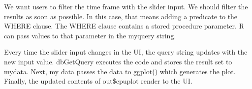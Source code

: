 \documentclass[]{article}
\newenvironment{Shaded}{\begin{snugshade}}{\end{snugshade}}
\newcommand{\CharTok}[1]{\textcolor[rgb]{0.31,0.60,0.02}{#1}}
\newcommand{\ControlFlowTok}[1]{\textcolor[rgb]{0.13,0.29,0.53}{\textbf{#1}}}
\newcommand{\DataTypeTok}[1]{\textcolor[rgb]{0.13,0.29,0.53}{#1}}
\newcommand{\DecValTok}[1]{\textcolor[rgb]{0.00,0.00,0.81}{#1}}
\newcommand{\KeywordTok}[1]{\textcolor[rgb]{0.13,0.29,0.53}{\textbf{#1}}}
\newcommand{\NormalTok}[1]{#1}
\newcommand{\OperatorTok}[1]{\textcolor[rgb]{0.81,0.36,0.00}{\textbf{#1}}}
\newcommand{\StringTok}[1]{\textcolor[rgb]{0.31,0.60,0.02}{#1}}
\begin{document}
We want users to filter the time frame with the slider input. We should
filter the results as soon as possible. In this case, that means adding
a predicate to the WHERE clause. The WHERE clause contains a stored
procedure parameter. R can pass values to that parameter in the myquery
string.

Every time the slider input changes in the UI, the query string updates
with the new input value. dbGetQuery executes the code and stores the
result set to mydata. Next, my data passes the data to ggplot() which
generates the plot. Finally, the updated contents of out\$cpuplot render
to the UI.

\begin{Shaded}
\end{Shaded}
\end{document}

